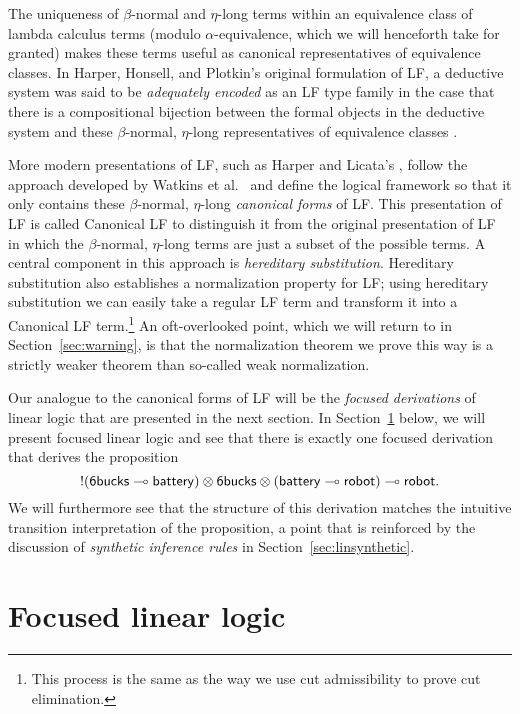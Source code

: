 The uniqueness of $\beta$-normal and $\eta$-long terms within an
equivalence class of lambda calculus terms (modulo
$\alpha$-equivalence, which we will henceforth take for granted) makes
these terms useful as canonical representatives of equivalence
classes. In Harper, Honsell, and Plotkin's original formulation
of LF, a deductive system was said to be {\it adequately encoded} as
an LF type family in the case that there is a compositional bijection
between the formal objects in the deductive system and these
$\beta$-normal, $\eta$-long representatives of equivalence classes
\cite{harper93framework}.

More modern presentations of LF, such as Harper and Licata's
\cite{harper07mechanizing}, follow the approach developed by Watkins
et al.~\cite{watkins02concurrent} and define the logical framework so
that it only contains these $\beta$-normal, $\eta$-long {\it canonical
  forms} of LF. This presentation of LF is called Canonical LF to
distinguish it from the original presentation of LF in which the
$\beta$-normal, $\eta$-long terms are just a subset of the possible
terms. A central component in this approach is {\it hereditary
  substitution}.  Hereditary substitution also establishes a
normalization property for LF; using hereditary substitution we can
easily take a regular LF term and transform it into a Canonical LF
term.\footnote{This process is the same as the way we use cut
  admissibility to prove cut elimination.} An oft-overlooked point,
which we will return to in Section~\ref{sec:warning}, is that the
normalization theorem we prove this way is a strictly weaker theorem
than so-called weak normalization.

Our analogue to the canonical forms of LF will be the {\it focused
  derivations} of linear logic that are presented in the next
section. In Section~\ref{sec:foclinlog} below, we will present 
focused linear logic and see that there is exactly 
one focused derivation that derives the proposition
\[{!}({\sf 6bucks} \multimap {\sf battery}) \otimes {\sf 6bucks} \otimes
({\sf battery} \multimap {\sf robot}) \multimap {\sf robot}.\] 
%
We will furthermore see that the structure of this derivation matches
the intuitive transition interpretation of the proposition, a point
that is reinforced by the discussion of {\it synthetic inference
  rules} in Section~\ref{sec:linsynthetic}. 

\section{Focused linear logic}
\label{sec:foclinlog}

